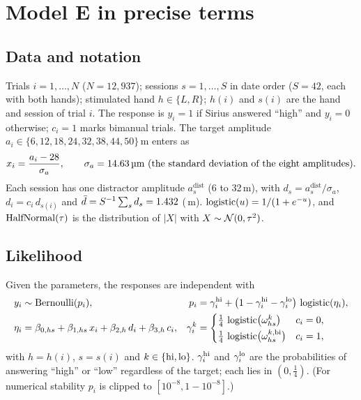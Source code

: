 \section{Model E in precise terms}

\subsection{Data and notation}
Trials $i=1,\dots,N$ ($N=12{,}937$); sessions $s=1,\dots,S$ in date order ($S=42$, each with both hands); stimulated hand $h\in\{L,R\}$; $h(i)$ and $s(i)$ are the hand and session of trial $i$.
The response is $y_i=1$ if Sirius answered ``high'' and $y_i=0$ otherwise; $c_i=1$ marks bimanual trials.
The target amplitude $a_i\in\{6,12,18,24,32,38,44,50\}$\,\textmu m enters as
\[
x_i=\frac{a_i-28}{\sigma_a},\qquad \sigma_a=\cnSigA\,\text{\textmu m (the standard deviation of the eight amplitudes)}.
\]
Each session has one distractor amplitude $a^{\mathrm{dist}}_s$ (6 to 32\,\textmu m), with $d_s=a^{\mathrm{dist}}_s/\sigma_a$, $d_i=c_i\,d_{s(i)}$ and $\bar d=S^{-1}\sum_s d_s=1.432$ (\cnDbarUm\,\textmu m).
$\operatorname{logistic}(u)=1/(1+e^{-u})$, and $\operatorname{HalfNormal}(\tau)$ is the distribution of $|X|$ with $X\sim\mathcal{N}(0,\tau^2)$.

\subsection{Likelihood}
Given the parameters, the responses are independent with
\begin{align*}
y_i &\sim \operatorname{Bernoulli}(p_i), &
p_i &= \gamma^{\mathrm{hi}}_i + \bigl(1-\gamma^{\mathrm{hi}}_i-\gamma^{\mathrm{lo}}_i\bigr)\,\operatorname{logistic}(\eta_i),\\
\eta_i &= \beta_{0,hs} + \beta_{1,hs}\,x_i + \beta_{2,h}\,d_i + \beta_{3,h}\,c_i, &
\gamma^{k}_i &= \begin{cases} \tfrac14\,\operatorname{logistic}\bigl(\omega^{k}_{hs}\bigr) & c_i=0,\\[2pt] \tfrac14\,\operatorname{logistic}\bigl(\omega^{k,\mathrm{bi}}_{hs}\bigr) & c_i=1,\end{cases}
\end{align*}
with $h=h(i)$, $s=s(i)$ and $k\in\{\mathrm{hi},\mathrm{lo}\}$.
$\gamma^{\mathrm{hi}}_i$ and $\gamma^{\mathrm{lo}}_i$ are the probabilities of answering ``high'' or ``low'' regardless of the target; each lies in $(0,\tfrac14)$.
(For numerical stability $p_i$ is clipped to $[10^{-8},1-10^{-8}]$.)


